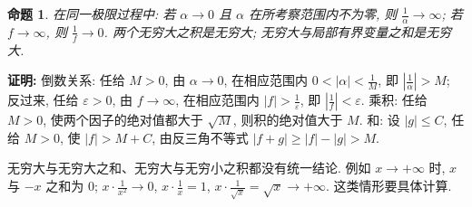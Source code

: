 \documentclass[UTF8,openany]{ctexbook}
\theoremstyle{chinesetextbook}
\newtheorem{proposition}{命题}[section]
\newenvironment{cnproof}{\par\indent\textbf{证明:} \ignorespaces}{\par}
\begin{document}
\begin{proposition}
在同一极限过程中: 若 $\alpha\to0$ 且 $\alpha$ 在所考察范围内不为零, 则 $\displaystyle\frac1\alpha\to\infty$; 若 $f\to\infty$, 则 $\displaystyle\frac1f\to0$. 两个无穷大之积是无穷大; 无穷大与局部有界变量之和是无穷大.
\end{proposition}
\begin{cnproof}
倒数关系: 任给 $M>0$, 由 $\alpha\to0$, 在相应范围内 $\displaystyle0<|\alpha|<\frac1M$, 即 $\displaystyle\left|\frac1\alpha\right|>M$; 反过来, 任给 $\varepsilon>0$, 由 $f\to\infty$, 在相应范围内 $\displaystyle|f|>\frac1\varepsilon$, 即 $\displaystyle\left|\frac1f\right|<\varepsilon$. 乘积: 任给 $M>0$, 使两个因子的绝对值都大于 $\sqrt M$, 则积的绝对值大于 $M$. 和: 设 $|g|\le C$, 任给 $M>0$, 使 $|f|>M+C$, 由反三角不等式 $|f+g|\ge|f|-|g|>M$.
\end{cnproof}
无穷大与无穷大之和、无穷大与无穷小之积都没有统一结论. 例如 $x\to+\infty$ 时, $x$ 与 $-x$ 之和为 $0$; $\displaystyle x\cdot\frac1{x^2}\to0$, $\displaystyle x\cdot\frac1x=1$, $\displaystyle x\cdot\frac1{\sqrt x}=\sqrt x\to+\infty$. 这类情形要具体计算.
\end{document}
